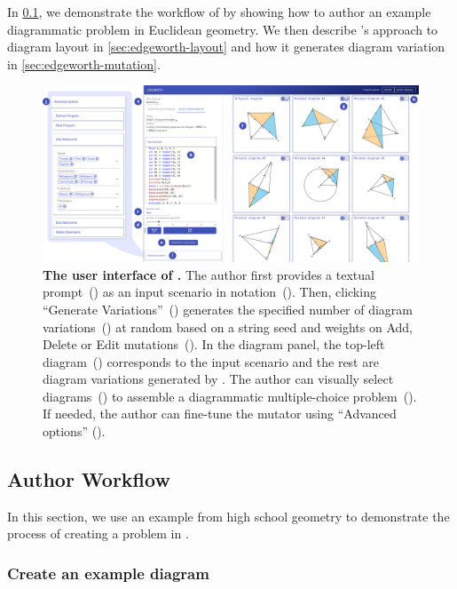 In \cref{sec:edgeworth-workflow}, we demonstrate the workflow of \Edgeworth by showing how to author an example diagrammatic problem in Euclidean geometry. We then describe \Edgeworth's approach to diagram layout in \cref{sec:edgeworth-layout} and how it generates diagram variation in \cref{sec:edgeworth-mutation}. 


\begin{figure}
    \centering
    \includegraphics[width=\linewidth]{assets/chapter-3/edgeworth-ui-new.pdf}
    \caption{\textbf{The user interface of \Edgeworth.} \textmd{The author first provides a textual prompt~() as an input scenario in \Substance notation~(). Then, clicking ``Generate Variations''~() generates the specified number of diagram variations~() at random based on a string seed and weights on Add, Delete or Edit mutations~(). In the diagram panel, the top-left diagram~() corresponds to the input scenario and the rest are diagram variations generated by \Edgeworth. The author can visually select diagrams~() to assemble a diagrammatic multiple-choice problem~(). If needed, the author can fine-tune the mutator using ``Advanced options'' (}). }
    \label{fig:edgeworth-interface}
\end{figure}

\subsection{Author Workflow}
\label{sec:edgeworth-workflow}

In this section, we use an example from high school geometry to demonstrate the process of creating a problem in \Edgeworth. 

\subsubsection{Create an example diagram} 
\label{sec:create-scenario}

